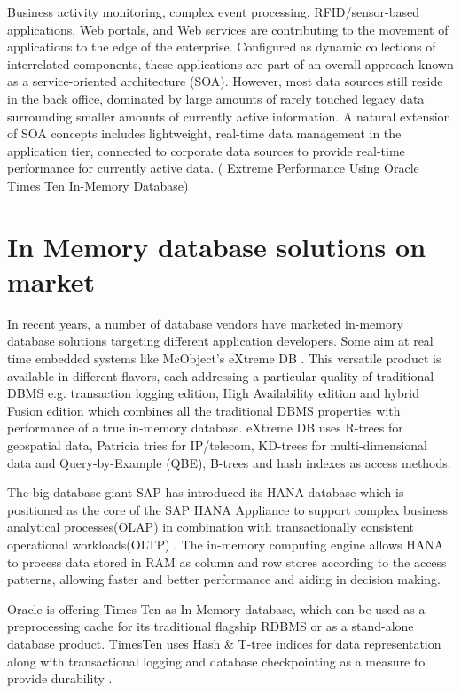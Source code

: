 \documentclass[12pt]{article} %
\begin{document}
Business activity monitoring, complex event processing, RFID/sensor-based applications, Web portals, and Web services are contributing to the movement of applications to the edge of the enterprise. Configured as dynamic collections of interrelated components, these applications are part of an overall approach known as a service-oriented architecture (SOA). However, most data sources still reside in the back office, dominated by large amounts of rarely touched legacy data surrounding smaller amounts of currently active information. A natural extension of SOA concepts includes lightweight, real-time data management in the application tier, connected to corporate data sources to provide real-time performance for currently active data. ( Extreme Performance Using Oracle Times Ten In-Memory Database)

\section{In Memory database solutions on market}
In recent years, a number of database vendors have marketed in-memory database solutions targeting different application developers. Some aim at real time embedded systems like McObject’s eXtreme DB \cite{Mcobject-RealvsImmi}. This versatile product is available in different flavors, each addressing a particular quality of traditional DBMS e.g. transaction logging edition, High Availability edition and hybrid Fusion edition which combines all the traditional DBMS properties with performance of a true in-memory database. eXtreme DB uses R-trees for geospatial data, Patricia tries for IP/telecom, KD-trees for multi-dimensional data and Query-by-Example (QBE), B-trees and hash indexes as access methods. 

The big database giant SAP has introduced its HANA database which is positioned as the core of the SAP HANA Appliance to support complex business analytical processes(OLAP) in combination with transactionally consistent operational workloads(OLTP) \cite{farber2012sap}. The in-memory computing engine allows HANA to process data stored in RAM as column and row stores according to the access patterns, allowing faster and better performance and aiding in decision making. 

Oracle is offering Times Ten as In-Memory database, which can be used as a preprocessing cache for its traditional flagship RDBMS or as a stand-alone database product. TimesTen uses Hash \& T-tree indices for data representation along with transactional logging and database checkpointing as a measure to provide durability \cite{oracleTimesTen}.
\end{document}
